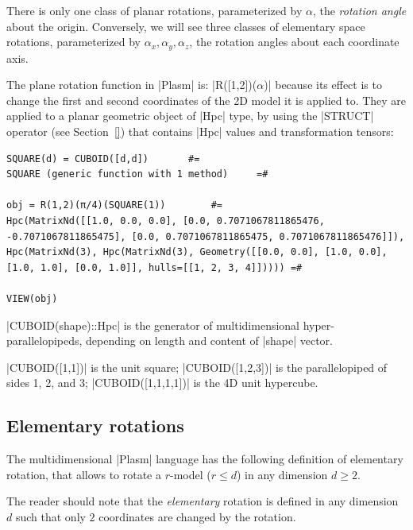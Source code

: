 There is only one class of planar rotations, parameterized by $\alpha$, the \emph{rotation angle} about the origin. Conversely, we will see three classes of elementary space rotations, parameterized by $\alpha_x, \alpha_y, \alpha_z$, the rotation angles about each coordinate axis.


\begin{coding}
The plane rotation function in |Plasm| is: |R([1,2])($\alpha$)| because its effect is to change the first and second coordinates of the 2D model it is applied to. They are applied to a planar geometric object of |Hpc| type, by using the |STRUCT| operator (see Section~\ref{}) that contains |Hpc| values and transformation tensors:
\begin{lstlisting}[language=JuliaLocal, style=julia, mathescape=false]
SQUARE(d) = CUBOID([d,d])		#=
SQUARE (generic function with 1 method)		=#

obj = R(1,2)(π/4)(SQUARE(1))		#=
Hpc(MatrixNd([[1.0, 0.0, 0.0], [0.0, 0.7071067811865476, -0.7071067811865475], [0.0, 0.7071067811865475, 0.7071067811865476]]), Hpc(MatrixNd(3), Hpc(MatrixNd(3), Geometry([[0.0, 0.0], [1.0, 0.0], [1.0, 1.0], [0.0, 1.0]], hulls=[[1, 2, 3, 4]])))) =#

VIEW(obj)
\end{lstlisting}
\end{coding}

\begin{remark}
|CUBOID(shape)::Hpc| is the generator of multidimensional hyper-par\-allelo\-pipeds, depending on length and content of |shape| vector. 

|CUBOID([1,1])| is the unit square;  |CUBOID([1,2,3])| is the parallelopiped of sides 1, 2, and 3; 
|CUBOID([1,1,1,1])| is the 4D unit hypercube.
\end{remark}


\subsection*{Elementary rotations}

The multidimensional |Plasm| language has the following definition of elementary rotation, that allows to rotate a $r$-model ($r\leq d$) in any dimension $d\geq 2$.

\begin{definition}
The reader should note that the \emph{elementary} rotation is defined in any dimension $d$  such that only $2$ coordinates are changed by the rotation.
\end{definition}


